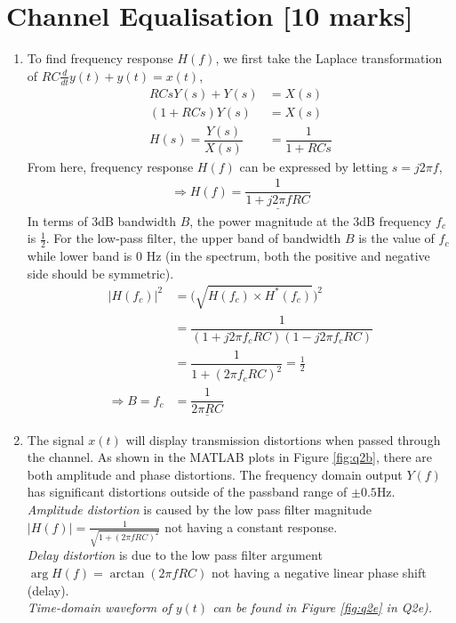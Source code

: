 \documentclass[11pt]{article}
\begin{document}
\section{Channel Equalisation [10 marks]}
\begin{enumerate}[label=(\alph*)]
\item %
To find frequency response $H(f)$, we first take the Laplace transformation of $RC\frac{d}{dt}y(t)+y(t)=x(t)$, 
\begin{align*}
        RCsY(s)+Y(s)&=X(s)\\
        (1+RCs)Y(s)&=X(s) \\
        H(s)=\dfrac{Y(s)}{X(s)}&=\dfrac{1}{1+RCs}
\end{align*}
From here, frequency response $H(f)$ can be expressed by letting $s=j2\pi f$,
\begin{align*}
        \Rightarrow H(f)=\underline{\dfrac{1}{1+j2\pi f RC}}
\end{align*}
In terms of 3dB bandwidth $B$, the power magnitude at the 3dB frequency $f_c$ is $\frac{1}{2}$. For the low-pass filter, the upper band of bandwidth $B$ is the value of $f_c$ while lower band is 0 Hz (in the spectrum, both the positive and negative side should be symmetric).
\begin{align*}
        |H(f_c)|^2 &=\Big(\sqrt{H(f_c)\times H^*(f_c)} \Big)^2\\ 
        &=\dfrac{1}{(1+j2\pi f_c RC)(1-j2\pi f_c RC)}\\
        &=\dfrac{1}{1+(2\pi f_c RC)^2} = \frac{1}{2}\\
        \Rightarrow B = f_c &=\underline{\dfrac{1}{2\pi RC}}
\end{align*}

\item %
The signal $x(t)$ will display transmission distortions when passed through the channel. As shown in the MATLAB plots in Figure \ref{fig:q2b}, there are both amplitude and phase distortions. The frequency domain output $Y(f)$ has significant distortions outside of the passband range of $\pm0.5$Hz.\\
\textit{Amplitude distortion} is caused by the low pass filter magnitude $|H(f)| = \frac{1}{\sqrt{1 + (2\pi fRC)^2}}$ not having a constant response.\\
\textit{Delay distortion} is due to the low pass filter argument $\arg H(f) = \arctan(2\pi fRC) $ not having a negative linear phase shift (delay).\\
\textit{Time-domain waveform of $y(t)$ can be found in Figure \ref{fig:q2e} in Q2e).}


\end{enumerate}
\end{document}
